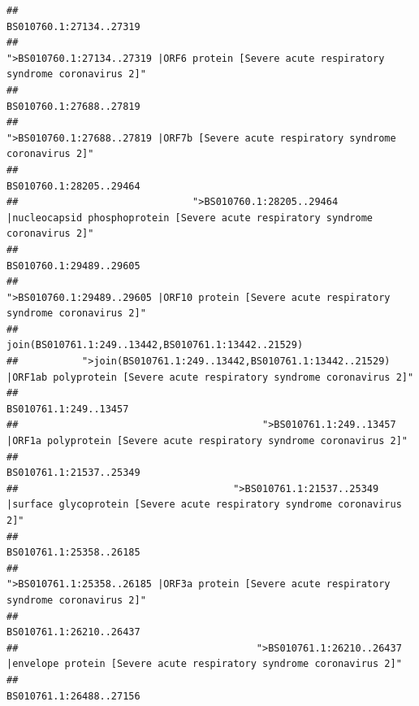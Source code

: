 \documentclass[
]{article}
\begin{document}
\begin{verbatim}
##                                                                                                                BS010760.1:27134..27319 
##                                             ">BS010760.1:27134..27319 |ORF6 protein [Severe acute respiratory syndrome coronavirus 2]" 
##                                                                                                                BS010760.1:27688..27819 
##                                                    ">BS010760.1:27688..27819 |ORF7b [Severe acute respiratory syndrome coronavirus 2]" 
##                                                                                                                BS010760.1:28205..29464 
##                              ">BS010760.1:28205..29464 |nucleocapsid phosphoprotein [Severe acute respiratory syndrome coronavirus 2]" 
##                                                                                                                BS010760.1:29489..29605 
##                                            ">BS010760.1:29489..29605 |ORF10 protein [Severe acute respiratory syndrome coronavirus 2]" 
##                                                                                    join(BS010761.1:249..13442,BS010761.1:13442..21529) 
##           ">join(BS010761.1:249..13442,BS010761.1:13442..21529) |ORF1ab polyprotein [Severe acute respiratory syndrome coronavirus 2]" 
##                                                                                                                  BS010761.1:249..13457 
##                                          ">BS010761.1:249..13457 |ORF1a polyprotein [Severe acute respiratory syndrome coronavirus 2]" 
##                                                                                                                BS010761.1:21537..25349 
##                                     ">BS010761.1:21537..25349 |surface glycoprotein [Severe acute respiratory syndrome coronavirus 2]" 
##                                                                                                                BS010761.1:25358..26185 
##                                            ">BS010761.1:25358..26185 |ORF3a protein [Severe acute respiratory syndrome coronavirus 2]" 
##                                                                                                                BS010761.1:26210..26437 
##                                         ">BS010761.1:26210..26437 |envelope protein [Severe acute respiratory syndrome coronavirus 2]" 
##                                                                                                                BS010761.1:26488..27156 

\end{verbatim}
\end{document}
